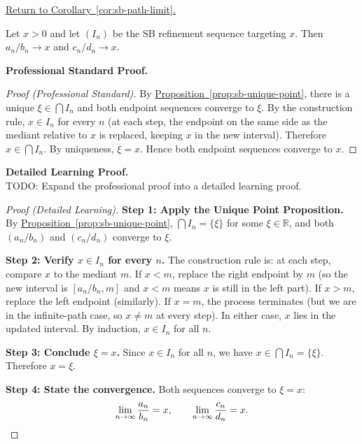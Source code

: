 
\newpage
{}
\label{prf:sb-path-limit}

\begin{remark*}[Return]
\hyperref[cor:sb-path-limit]{Return to Corollary~\ref*{cor:sb-path-limit}.}
\end{remark*}

\begin{theorem*}
Let $x > 0$ and let $(I_n)$ be the SB refinement sequence targeting $x$.
Then $a_n/b_n \to x$ and $c_n/d_n \to x$.
\end{theorem*}

\textbf{Professional Standard Proof.}~\\
\begin{proof}
[Proof (Professional Standard)]
By \hyperref[prop:sb-unique-point]{Proposition~\ref*{prop:sb-unique-point}},
there is a unique $\xi \in \bigcap I_n$ and both endpoint sequences
converge to $\xi$.  By the construction rule, $x \in I_n$ for every $n$
(at each step, the endpoint on the same side as the mediant relative to
$x$ is replaced, keeping $x$ in the new interval).  Therefore
$x \in \bigcap I_n$.  By uniqueness, $\xi = x$.  Hence both endpoint
sequences converge to $x$.
\end{proof}

\textbf{Detailed Learning Proof.}~\\
TODO: Expand the professional proof into a detailed learning proof.


\begin{proof}[Proof (Detailed Learning)]
\textbf{Step 1: Apply the Unique Point Proposition.}
By \hyperref[prop:sb-unique-point]{Proposition~\ref*{prop:sb-unique-point}},
$\bigcap I_n = \{\xi\}$ for some $\xi \in \mathbb{R}$, and both
$(a_n/b_n)$ and $(c_n/d_n)$ converge to $\xi$.

\textbf{Step 2: Verify $x \in I_n$ for every $n$.}
The construction rule is: at each step, compare $x$ to the mediant $m$.
If $x < m$, replace the right endpoint by $m$ (so the new interval is
$[a_n/b_n, m]$ and $x < m$ means $x$ is still in the left part).
If $x > m$, replace the left endpoint (similarly).
If $x = m$, the process terminates (but we are in the infinite-path
case, so $x \neq m$ at every step).
In either case, $x$ lies in the updated interval.  By induction, $x \in I_n$
for all $n$.

\textbf{Step 3: Conclude $\xi = x$.}
Since $x \in I_n$ for all $n$, we have $x \in \bigcap I_n = \{\xi\}$.
Therefore $x = \xi$.

\textbf{Step 4: State the convergence.}
Both sequences converge to $\xi = x$:
\[
\lim_{n\to\infty} \frac{a_n}{b_n} = x,
\qquad
\lim_{n\to\infty} \frac{c_n}{d_n} = x.
\qedhere
\]
\end{proof}

